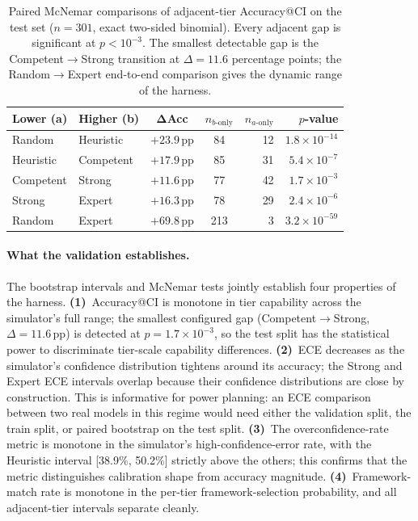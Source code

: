 \documentclass{article}
\begin{document}
\begin{table}[t]
\centering
\caption{Paired McNemar comparisons of adjacent-tier Accuracy@CI on the test set ($n = 301$, exact two-sided binomial). Every adjacent gap is significant at $p < 10^{-3}$. The smallest detectable gap is the Competent$\to$Strong transition at $\Delta = 11.6$ percentage points; the Random$\to$Expert end-to-end comparison gives the dynamic range of the harness.}
\label{tab:mcnemar}
\begin{tabular}{llccrr}
\toprule
\textbf{Lower (a)} & \textbf{Higher (b)} & $\boldsymbol{\Delta}$\textbf{Acc} & $n_{b\text{-only}}$ & $n_{a\text{-only}}$ & $p$-value \\
\midrule
Random      & Heuristic  & $+23.9$\,pp & 84  & 12  & $1.8\times10^{-14}$ \\
Heuristic   & Competent  & $+17.9$\,pp & 85  & 31  & $5.4\times10^{-7}$ \\
Competent   & Strong     & $+11.6$\,pp & 77  & 42  & $1.7\times10^{-3}$ \\
Strong      & Expert     & $+16.3$\,pp & 78  & 29  & $2.4\times10^{-6}$ \\
\midrule
Random      & Expert     & $+69.8$\,pp & 213 & 3   & $3.2\times10^{-59}$ \\
\bottomrule
\end{tabular}
\end{table}

\paragraph{What the validation establishes.}
The bootstrap intervals and McNemar tests jointly establish four properties of the harness.
\textbf{(1)}~Accuracy@CI is monotone in tier capability across the simulator's full range; the smallest configured gap (Competent$\to$Strong, $\Delta = 11.6$\,pp) is detected at $p = 1.7\times10^{-3}$, so the test split has the statistical power to discriminate tier-scale capability differences.
\textbf{(2)}~ECE decreases as the simulator's confidence distribution tightens around its accuracy; the Strong and Expert ECE intervals overlap because their confidence distributions are close by construction. This is informative for power planning: an ECE comparison between two real models in this regime would need either the validation split, the train split, or paired bootstrap on the test split.
\textbf{(3)}~The overconfidence-rate metric is monotone in the simulator's high-confidence-error rate, with the Heuristic interval [38.9\%, 50.2\%] strictly above the others; this confirms that the metric distinguishes calibration shape from accuracy magnitude.
\textbf{(4)}~Framework-match rate is monotone in the per-tier framework-selection probability, and all adjacent-tier intervals separate cleanly.
\end{document}
